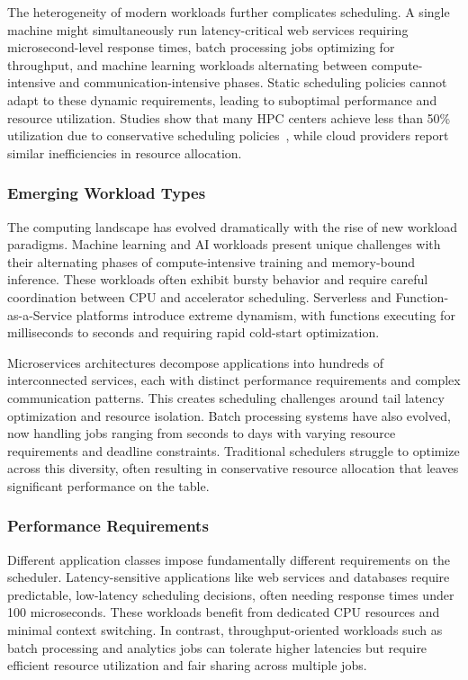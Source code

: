 The heterogeneity of modern workloads further complicates scheduling. A single machine might simultaneously run latency-critical web services requiring microsecond-level response times, batch processing jobs optimizing for throughput, and machine learning workloads alternating between compute-intensive and communication-intensive phases. Static scheduling policies cannot adapt to these dynamic requirements, leading to suboptimal performance and resource utilization. Studies show that many HPC centers achieve less than 50\% utilization due to conservative scheduling policies~\cite{feitelson2023utilization}, while cloud providers report similar inefficiencies in resource allocation.

\subsubsection{Emerging Workload Types}

The computing landscape has evolved dramatically with the rise of new workload paradigms. Machine learning and AI workloads present unique challenges with their alternating phases of compute-intensive training and memory-bound inference. These workloads often exhibit bursty behavior and require careful coordination between CPU and accelerator scheduling. Serverless and Function-as-a-Service platforms introduce extreme dynamism, with functions executing for milliseconds to seconds and requiring rapid cold-start optimization.

Microservices architectures decompose applications into hundreds of interconnected services, each with distinct performance requirements and complex communication patterns. This creates scheduling challenges around tail latency optimization and resource isolation. Batch processing systems have also evolved, now handling jobs ranging from seconds to days with varying resource requirements and deadline constraints. Traditional schedulers struggle to optimize across this diversity, often resulting in conservative resource allocation that leaves significant performance on the table.

\subsubsection{Performance Requirements}

Different application classes impose fundamentally different requirements on the scheduler. Latency-sensitive applications like web services and databases require predictable, low-latency scheduling decisions, often needing response times under 100 microseconds. These workloads benefit from dedicated CPU resources and minimal context switching. In contrast, throughput-oriented workloads such as batch processing and analytics jobs can tolerate higher latencies but require efficient resource utilization and fair sharing across multiple jobs.

